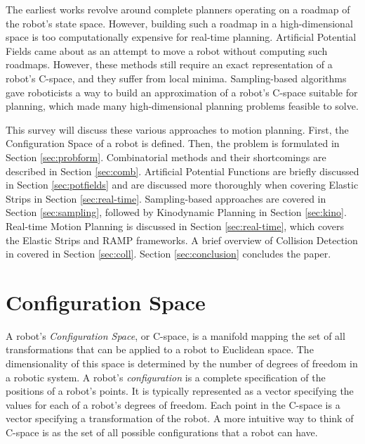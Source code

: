 \documentclass[10pt,conference]{ieeeconf}
\begin{document}
	
	The earliest works revolve around complete planners operating on a roadmap of the robot's state space. However, building such a roadmap in a high-dimensional space is too  computationally expensive for real-time planning. Artificial Potential Fields came about as an attempt to move a robot without computing such roadmaps. However, these methods still require an exact representation of a robot's C-space, and they suffer from local minima. Sampling-based algorithms gave roboticists a way to build an approximation of a robot's C-space suitable for planning, which made many high-dimensional planning problems feasible to solve.
	
	This survey will discuss these various approaches to motion planning. First, the Configuration Space of a robot is defined. Then, the problem is formulated in Section \ref{sec:probform}. Combinatorial methods and their shortcomings are described in Section \ref{sec:comb}. Artificial Potential Functions are briefly discussed in Section \ref{sec:potfields} and are discussed more thoroughly when covering Elastic Strips in Section \ref{sec:real-time}. Sampling-based approaches are covered in Section \ref{sec:sampling}, followed by Kinodynamic Planning in Section \ref{sec:kino}. Real-time Motion Planning is discussed in Section \ref{sec:real-time}, which covers the Elastic Strips and RAMP frameworks. A brief overview of Collision Detection in covered in Section \ref{sec:coll}. Section \ref{sec:conclusion} concludes the paper.

	
\section{Configuration Space}\label{sec:C-space}

A robot's \emph{Configuration Space}, or C-space, is a manifold mapping the set of all transformations that can be applied to a robot to Euclidean space. The dimensionality of this space is determined by the number of degrees of freedom in a robotic system. A robot's \emph{configuration} is a complete specification of the positions of a robot's points. It is typically represented as a vector specifying the values for each of a robot's degrees of freedom. Each point in the C-space is a vector specifying a transformation of the robot. A more intuitive way to think of C-space is as the set of all possible configurations that a robot can have.
\end{document}
